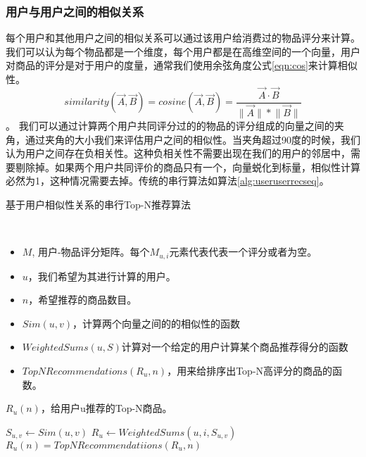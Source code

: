 \subsubsection{用户与用户之间的相似关系}
每个用户和其他用户之间的相似关系可以通过该用户给消费过的物品评分来计算。我们可以认为每个物品都是一个维度，每个用户都是在高维空间的一个向量，用户对商品的评分是对于用户的度量，通常我们使用余弦角度公式\ref{eqn:cos}来计算相似性。
    \begin{equation}\label{eqn:cos}
       similarity(\vec{A}, \vec{B}) = cosine(\vec{A}, \vec{B}) = \frac{\vec{A} \cdot \vec{B}}{\lVert\vec{A}\rVert\ast\lVert\vec{B}\rVert}
    \end{equation}。
    我们可以通过计算两个用户共同评分过的的物品的评分组成的向量之间的夹角，通过夹角的大小我们来评估用户之间的相似性。当夹角超过90度的时候，我们认为用户之间存在负相关性。这种负相关性不需要出现在我们的用户的邻居中，需要剔除掉。如果两个用户共同评价的商品只有一个，向量蜕化到标量，相似性计算必然为1，这种情况需要去掉。传统的串行算法如算法\ref{alg:useruserrecseq}。

 \begin{algorithm}
        \caption{基于用户相似性关系的串行Top-N推荐算法}\label{alg:useruserrecseq}
        \begin{algorithmic}[1] %
            \Require \\
            \begin{itemize}
                \item $M$, 用户-物品评分矩阵。每个$M_{u,i}$元素代表代表一个评分或者为空。
                \item $u$，我们希望为其进行计算的用户。
                \item $n$，希望推荐的商品数目。
                \item $Sim(u, v)$，计算两个向量之间的的相似性的函数
                \item $WeightedSums(u, S)$计算对一个给定的用户计算某个商品推荐得分的函数
                \item $TopNRecommendations(R_u, n)$，用来给排序出Top-N高评分的商品的函数。
            \end{itemize}
            \Ensure $R_u(n)$，给用户u推荐的Top-N商品。

        
                    \State $S_{u, v} \leftarrow Sim(u, v)$
                \EndIf 
                        \State $R_u \leftarrow WeightedSums(u, i, S_{u, v})$
                    \EndIf
                \EndFor
            \EndFor 
            \State $R_u(n) = TopNRecommendatiions(R_u, n)$
        \end{algorithmic}
    \end{algorithm}


